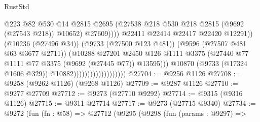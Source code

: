\begin{lexlean}{RustStd}
\begin{coremodule}
                                                        @223
                                                        @82
                                                        @530
                                                        @14
                                                        @2815
                                                        @2695
                                                        (@27538
                                                          @218
                                                          @530
                                                          @218
                                                          @2815
                                                          (@9692 (@27543 @218))
                                                          @10652)
                                                        @27609))))
                                                @22411
                                                @22414
                                                @22417
                                                @22420
                                                @12291))
                                            (@10236 (@27496 @34))
                                            (@9733 (@27500 @123 @481))
                                            (@9596 (@27507 @481 @63 @3677 @2711))
                                            (@10288
                                              @27201
                                              @2450
                                              @126
                                              @1111
                                              @3375
                                              (@27440
                                                @77
                                                @1111
                                                @77
                                                @3375
                                                (@9692 (@27445 @77))
                                                @13595)))
                                          @10870
                                          (@9733 (@17324 @1606 @329))
                                          @10882)))))))))))))))))))
@27704 := @9256 @1126
@27708 := @9258 (@9262 @1126) (@9268 @1126)
@27709 := @9287 @1126
@27710 := @9277 @27709
@27712 := @9273 (@27710 @9292)
@27714 := @9315 (@9316 @1126)
@27715 := @9311 @27714
@27717 := @9273 (@27715 @9340)
@27734 := @9272
    (fun (fn : @58) =>
    @27712
      (@9295
        (@9298
          (fun (params : @9297) =>

\end{coremodule}
\end{lexlean}
